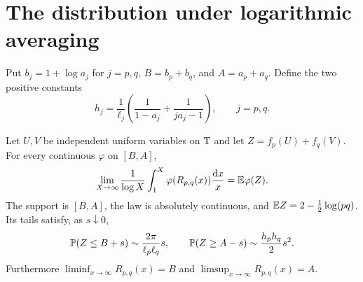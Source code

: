\section{The distribution under logarithmic averaging}\label{sec:distribution}
Put $b_j=1+\log a_j$ for $j=p,q$,
$B=b_p+b_q$, and $A=a_p+a_q$. Define the two positive constants
\begin{equation}
 h_j=\frac{1}{\ell_j}\left(\frac{1}{1-a_j}+
                         \frac{1}{j a_j-1}\right),\qquad j=p,q .
 \label{eq:h}
\end{equation}
\begin{theorem}\label{thm:log}
Let $U,V$ be independent uniform variables on $\mathbb T$ and let
$Z=f_p(U)+f_q(V)$. For every continuous $\varphi$ on $[B,A]$,
\begin{equation}
 \lim_{X\to\infty}\frac1{\log X}\int_1^X
   \varphi(R_{p,q}(x))\frac{\mathrm dx}{x}
   =\mathbb E\varphi(Z). \label{eq:loglaw}
\end{equation}
The support is $[B,A]$, the law is absolutely continuous, and
$\mathbb E Z=2-\tfrac12\log(pq)$. Its tails satisfy, as $s\downarrow0$,
\begin{equation}
 \mathbb P(Z\leq B+s)\sim \frac{2\pi}{\ell_p\ell_q}s,\qquad
 \mathbb P(Z\geq A-s)\sim \frac{h_p h_q}{2}s^2.
 \label{eq:tails}
\end{equation}
Furthermore $\liminf_{x\to\infty}R_{p,q}(x)=B$ and
$\limsup_{x\to\infty}R_{p,q}(x)=A$.
\end{theorem}

